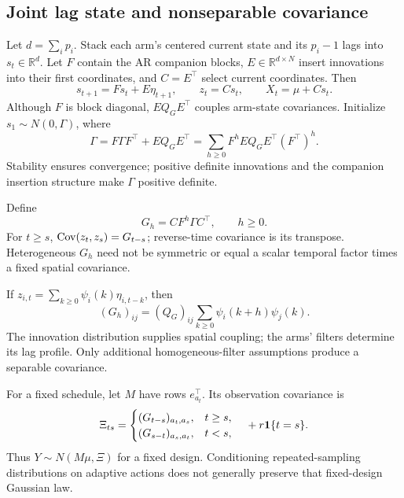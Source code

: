 \subsection{Joint lag state and nonseparable covariance}
Let $d=\sum_i p_i$. Stack each arm's centered current state and its $p_i-1$ lags into $s_t\in\mathbb R^d$. Let $F$ contain the AR companion blocks, $E\in\mathbb R^{d\times N}$ insert innovations into their first coordinates, and $C=E^\top$ select current coordinates. Then
\begin{equation}
s_{t+1}=Fs_t+E\eta_{t+1},\qquad z_t=Cs_t,\qquad X_t=\mu+Cs_t.
\label{spatiotemporal_bandits:eq:state}
\end{equation}
Although $F$ is block diagonal, $EQ_GE^\top$ couples arm-state covariances. Initialize $s_1\sim N(0,\Gamma)$, where
\begin{equation}
\Gamma=F\Gamma F^\top+EQ_GE^\top
=\sum_{h\ge0}F^hEQ_GE^\top(F^\top)^h.
\label{spatiotemporal_bandits:eq:lyapunov}
\end{equation}
Stability ensures convergence; positive definite innovations and the companion insertion structure make $\Gamma$ positive definite.

Define
\begin{equation}
G_h=CF^h\Gamma C^\top,\qquad h\ge0.
\label{spatiotemporal_bandits:eq:lags}
\end{equation}
For $t\ge s$, $\operatorname{Cov}(z_t,z_s)=G_{t-s}$; reverse-time covariance is its transpose. Heterogeneous $G_h$ need not be symmetric or equal a scalar temporal factor times a fixed spatial covariance.

If $z_{i,t}=\sum_{k\ge0}\psi_i(k)\eta_{i,t-k}$, then
\begin{equation}
\boxed{(G_h)_{ij}=(Q_G)_{ij}\sum_{k\ge0}\psi_i(k+h)\psi_j(k).}
\label{spatiotemporal_bandits:eq:impulses}
\end{equation}
The innovation distribution supplies spatial coupling; the arms' filters determine its lag profile. Only additional homogeneous-filter assumptions produce a separable covariance.

For a fixed schedule, let $M$ have rows $e_{a_t}^\top$. Its observation covariance is
\begin{equation}
\Xi_{ts}=
\begin{cases}
(G_{t-s})_{a_t,a_s},&t\ge s,\\
(G_{s-t})_{a_s,a_t},&t<s,
\end{cases}
\quad{}+r\mathbf1\{t=s\}.
\label{spatiotemporal_bandits:eq:xi}
\end{equation}
Thus $Y\sim N(M\mu,\Xi)$ for a fixed design. Conditioning repeated-sampling distributions on adaptive actions does not generally preserve that fixed-design Gaussian law.

